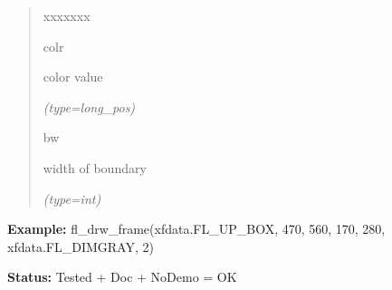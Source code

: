 \begin{boxedminipage}{\funcwidth}
\begin{quote}
\begin{Ventry}{xxxxxxx}
          \item[colr]

          color value

            {\it (type=long\_pos)}

          \item[bw]

          width of boundary

            {\it (type=int)}

        \end{Ventry}

      \end{quote}

\textbf{Example:} fl\_drw\_frame(xfdata.FL\_UP\_BOX, 470, 560, 170, 280, xfdata.FL\_DIMGRAY, 
2)



\textbf{Status:} Tested + Doc + NoDemo = OK



    \end{boxedminipage}

    \label{xformslib:flxbasic:fl_drw_checkbox}

    \vspace{0.5ex}

